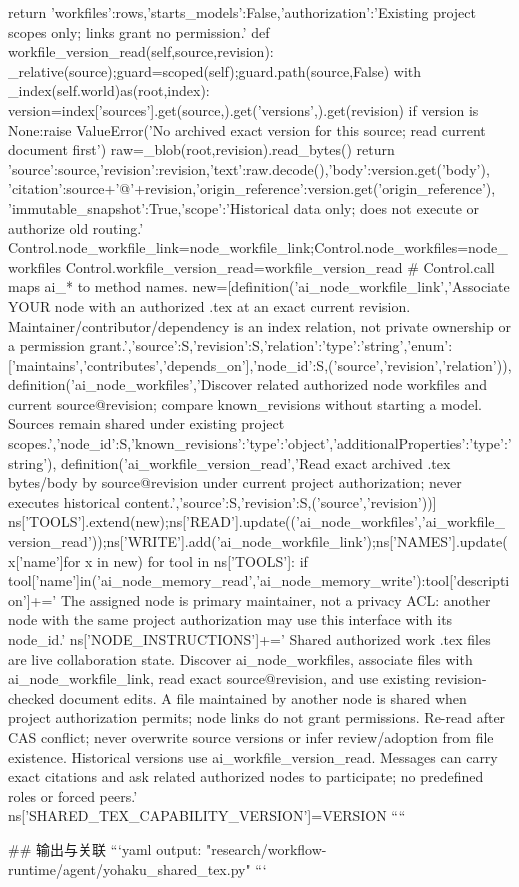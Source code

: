         return {'workfiles':rows,'starts_models':False,'authorization':'Existing project scopes only; links grant no permission.'}
    def workfile_version_read(self,source,revision):
        _relative(source);guard=scoped(self);guard.path(source,False)
        with _index(self.world)as(root,index):
            version=index['sources'].get(source,{}).get('versions',{}).get(revision)
            if version is None:raise ValueError('No archived exact version for this source; read current document first')
            raw=_blob(root,revision).read_bytes()
            return {'source':source,'revision':revision,'text':raw.decode(),'body':version.get('body'),
                'citation':source+'@'+revision,'origin_reference':version.get('origin_reference'),
                'immutable_snapshot':True,'scope':'Historical data only; does not execute or authorize old routing.'}
    Control.node_workfile_link=node_workfile_link;Control.node_workfiles=node_workfiles
    Control.workfile_version_read=workfile_version_read
    # Control.call maps ai_* to method names.
    new=[definition('ai_node_workfile_link','Associate YOUR node with an authorized .tex at an exact current revision. Maintainer/contributor/dependency is an index relation, not private ownership or a permission grant.',{'source':S,'revision':S,'relation':{'type':'string','enum':['maintains','contributes','depends_on']},'node_id':S},('source','revision','relation')),
         definition('ai_node_workfiles','Discover related authorized node workfiles and current source@revision; compare known_revisions without starting a model. Sources remain shared under existing project scopes.',{'node_id':S,'known_revisions':{'type':'object','additionalProperties':{'type':'string'}}}),
         definition('ai_workfile_version_read','Read exact archived .tex bytes/body by source@revision under current project authorization; never executes historical content.',{'source':S,'revision':S},('source','revision'))]
    ns['TOOLS'].extend(new);ns['READ'].update(('ai_node_workfiles','ai_workfile_version_read'));ns['WRITE'].add('ai_node_workfile_link');ns['NAMES'].update(x['name']for x in new)
    for tool in ns['TOOLS']:
        if tool['name']in('ai_node_memory_read','ai_node_memory_write'):tool['description']+=' The assigned node is primary maintainer, not a privacy ACL: another node with the same project authorization may use this interface with its node_id.'
    ns['NODE_INSTRUCTIONS']+=' Shared authorized work .tex files are live collaboration state. Discover ai_node_workfiles, associate files with ai_node_workfile_link, read exact source@revision, and use existing revision-checked document edits. A file maintained by another node is shared when project authorization permits; node links do not grant permissions. Re-read after CAS conflict; never overwrite source versions or infer review/adoption from file existence. Historical versions use ai_workfile_version_read. Messages can carry exact citations and ask related authorized nodes to participate; no predefined roles or forced peers.'
    ns['SHARED_TEX_CAPABILITY_VERSION']=VERSION
````

## 输出与关联
```yaml
output: "research/workflow-runtime/agent/yohaku_shared_tex.py"
```
